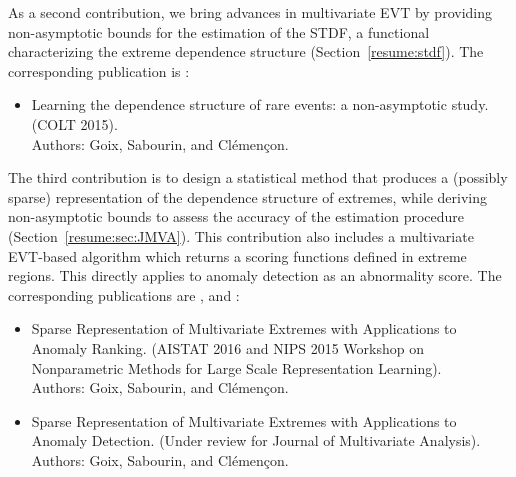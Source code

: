 


As a second contribution, we bring advances in multivariate EVT by providing non-asymptotic bounds for the estimation of the STDF, a functional characterizing the extreme dependence structure (Section~\ref{resume:stdf}). The corresponding publication is \cite{COLT15}:
\begin{itemize}
\item Learning the dependence structure of rare events: a non-asymptotic study. (COLT 2015).\\
Authors: Goix, Sabourin, and Clémençon.
\end{itemize}

The third contribution is to design a statistical method that produces a (possibly sparse) representation of the dependence structure of extremes, while deriving non-asymptotic bounds to assess the accuracy of the estimation procedure (Section~\ref{resume:sec:JMVA}).
%
This contribution also includes a multivariate EVT-based algorithm which returns a scoring functions defined in extreme regions. This directly applies to anomaly detection as an abnormality score.
The corresponding publications are \cite{AISTAT16}, \cite{NIPSWORKSHOP15} and \cite{ARXIV16}:
%
\begin{itemize}
\item Sparse Representation of Multivariate Extremes with Applications to Anomaly Ranking. (AISTAT 2016 and NIPS 2015 Workshop on Nonparametric Methods for Large Scale Representation Learning).\\
Authors: Goix, Sabourin, and Clémençon.
\item Sparse Representation of Multivariate Extremes with Applications to Anomaly Detection. (Under review for Journal of Multivariate Analysis).\\
Authors: Goix, Sabourin, and Clémençon.
\end{itemize}





